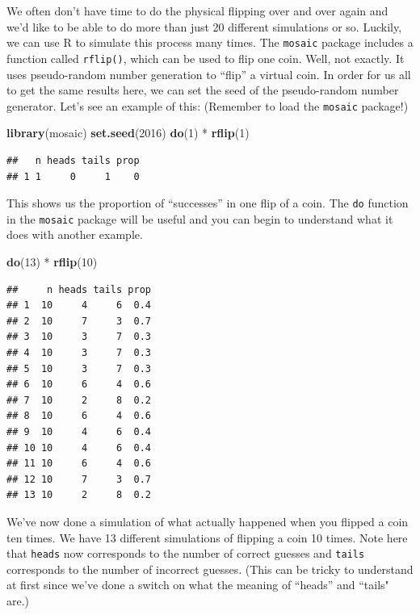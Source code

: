 \documentclass[]{tufte-book}
\newenvironment{Shaded}{\begin{snugshade}}{\end{snugshade}}
\newcommand{\KeywordTok}[1]{\textcolor[rgb]{0.13,0.29,0.53}{\textbf{{#1}}}}
\newcommand{\DecValTok}[1]{\textcolor[rgb]{0.00,0.00,0.81}{{#1}}}
\newcommand{\StringTok}[1]{\textcolor[rgb]{0.31,0.60,0.02}{{#1}}}
\newcommand{\NormalTok}[1]{{#1}}
\begin{document}
We often don't have time to do the physical flipping over and over again
and we'd like to be able to do more than just 20 different simulations
or so. Luckily, we can use R to simulate this process many times. The
\texttt{mosaic} package includes a function called \texttt{rflip()},
which can be used to flip one coin. Well, not exactly. It uses
pseudo-random number generation to ``flip'' a virtual coin. In order for
us all to get the same results here, we can set the seed of the
pseudo-random number generator. Let's see an example of this: (Remember
to load the \texttt{mosaic} package!)

\begin{Shaded}
\begin{Highlighting}[]
\KeywordTok{library}\NormalTok{(mosaic)}
\KeywordTok{set.seed}\NormalTok{(}\DecValTok{2016}\NormalTok{)}
\KeywordTok{do}\NormalTok{(}\DecValTok{1}\NormalTok{) *}\StringTok{ }\KeywordTok{rflip}\NormalTok{(}\DecValTok{1}\NormalTok{)}
\end{Highlighting}
\end{Shaded}

\begin{verbatim}
##   n heads tails prop
## 1 1     0     1    0
\end{verbatim}

This shows us the proportion of ``successes'' in one flip of a coin. The
\texttt{do} function in the \texttt{mosaic} package will be useful and
you can begin to understand what it does with another example.

\begin{Shaded}
\begin{Highlighting}[]
\KeywordTok{do}\NormalTok{(}\DecValTok{13}\NormalTok{) *}\StringTok{ }\KeywordTok{rflip}\NormalTok{(}\DecValTok{10}\NormalTok{)}
\end{Highlighting}
\end{Shaded}

\begin{verbatim}
##     n heads tails prop
## 1  10     4     6  0.4
## 2  10     7     3  0.7
## 3  10     3     7  0.3
## 4  10     3     7  0.3
## 5  10     3     7  0.3
## 6  10     6     4  0.6
## 7  10     2     8  0.2
## 8  10     6     4  0.6
## 9  10     4     6  0.4
## 10 10     4     6  0.4
## 11 10     6     4  0.6
## 12 10     7     3  0.7
## 13 10     2     8  0.2
\end{verbatim}

We've now done a simulation of what actually happened when you flipped a
coin ten times. We have 13 different simulations of flipping a coin 10
times. Note here that \texttt{heads} now corresponds to the number of
correct guesses and \texttt{tails} corresponds to the number of
incorrect guesses. (This can be tricky to understand at first since
we've done a switch on what the meaning of ``heads'' and ``tails" are.)
\end{document}
